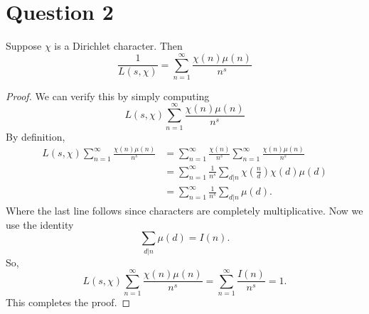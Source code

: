 \documentclass{unswmaths}
\begin{document}
    \section*{Question 2}
    \begin{proposition}
        Suppose $\chi$ is a Dirichlet character. Then
        \begin{equation*}
            \frac{1}{L(s,\chi)} = \sum_{n=1}^\infty \frac{\chi(n)\mu(n)}{n^s}
        \end{equation*}
    \end{proposition}
    \begin{proof}
        We can verify this by simply computing 
        \begin{equation*}
            L(s,\chi)\sum_{n=1}^\infty \frac{\chi(n)\mu(n)}{n^s}
        \end{equation*}
        By definition,
        \begin{align*}
            L(s,\chi)\sum_{n=1}^\infty \frac{\chi(n)\mu(n)}{n^s} &= \sum_{n=1}^\infty \frac{\chi(n)}{n^s}\sum_{n=1}^\infty \frac{\chi(n)\mu(n)}{n^s}\\
            &= \sum_{n=1}^\infty \frac{1}{n^s}\sum_{d|n} \chi\left(\frac{n}{d}\right)\chi(d)\mu(d)\\
            &= \sum_{n=1}^\infty \frac{1}{n^s}\sum_{d|n} \mu(d).
        \end{align*}
        Where the last line follows since characters are completely multiplicative. Now we use the identity
        \begin{equation*}
            \sum_{d|n}\mu(d) = I(n).
        \end{equation*}
        So,
        \begin{equation*}
            L(s,\chi)\sum_{n=1}^\infty \frac{\chi(n)\mu(n)}{n^s} = \sum_{n=1}^\infty \frac{I(n)}{n^s} = 1.
        \end{equation*}
        This completes the proof.
    \end{proof}
    
\end{document}
